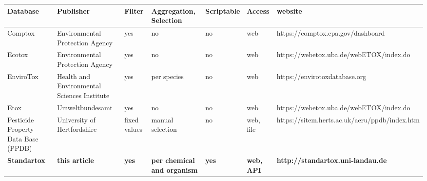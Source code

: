 


\begin{tabular}{|m{3cm}|m{3cm}|m{1cm}|m{2cm}|m{1cm}|m{2cm}|l|}
\hline
Database & Publisher & Filter & Aggregation, Selection & Scriptable & Access & website \\
\hline
Comptox & Environmental Protection Agency & yes & no & no & web & https://comptox.epa.gov/dashboard \\
\hline
Ecotox & Environmental Protection Agency & yes & no & no & web & https://webetox.uba.de/webETOX/index.do \\
\hline
EnviroTox & Health and Environmental Sciences Institute & yes & per species & no & web & https://envirotoxdatabase.org \\
\hline
Etox & Umweltbundesamt & yes & no & no & web & https://webetox.uba.de/webETOX/index.do \\
\hline
Pesticide Property Data Base (PPDB) & University of Hertfordshire & fixed values & manual selection & no & web, file & https://sitem.herts.ac.uk/aeru/ppdb/index.htm \\
\hline
\textbf{Standartox} & \textbf{this article} & \textbf{yes} & \textbf{per chemical and organism} & \textbf{yes} & \textbf{web, API} & \textbf{http://standartox.uni-landau.de} \\
\hline
\end{tabular}


